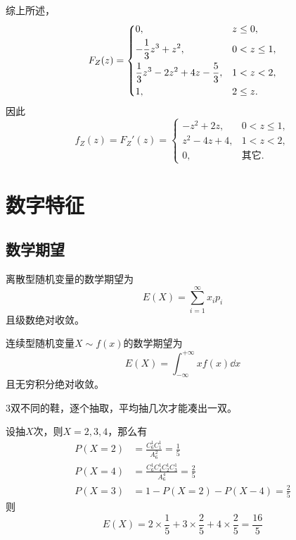\begin{solution}
\begin{enumerate}[(1)]
              综上所述，
              \[
                  F_Z(z) =
                  \begin{dcases}
                      0,                                    & z\leq 0,   \\
                      -\frac{1}{3}z^3+z^2,                  & 0<z\leq 1, \\
                      \frac{1}{3}z^3 -2z^2+4z -\frac{5}{3}, & 1<z < 2,   \\
                      1,                                    & 2\leq z.
                  \end{dcases}
              \]
              因此
              \[
                  f_Z(z) = F_Z'(z) =
                  \begin{cases}
                      -z^2+2z,  & 0<z\leq 1,   \\
                      z^2-4z+4, & 1<z<2,       \\
                      0,        & \text{其它}.
                  \end{cases}
              \]
    \end{enumerate}
\end{solution}

\section{数字特征}
\subsection{数学期望}
离散型随机变量的数学期望为
\begin{equation}
    E(X) = \sum_{i=1}^\infty x_ip_i
\end{equation}
且级数绝对收敛。

连续型随机变量$X\sim f(x)$的数学期望为
\begin{equation}
    E(X) = \int_{-\infty}^{+\infty} xf(x)\dd{x}
\end{equation}
且无穷积分绝对收敛。

\begin{example}
    3双不同的鞋，逐个抽取，平均抽几次才能凑出一双。
\end{example}
\begin{solution}
    设抽$X$次，则$X=2,3,4$，那么有
    \begin{align*}
        P(X=2) & = \frac{C_6^1C_1^1}{A_6^2} = \frac{1}{5}            \\
        P(X=4) & = \frac{C_6^1C_4^1C_2^1 C_3^1}{A_6^4} = \frac{2}{5} \\
        P(X=3) & = 1-P(X=2)-P(X-4) = \frac{2}{5}
    \end{align*}
    则
    \[ E(X) = 2\times \frac{1}{5} + 3 \times \frac{2}{5} + 4\times \frac{2}{5} = \frac{16}{5} \]
\end{solution}

